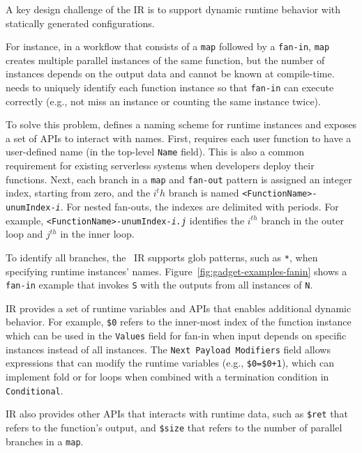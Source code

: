 A key design challenge of the \name{} IR is to support dynamic runtime
behavior with statically generated configurations.

For instance, in a workflow that consists of a \texttt{map} followed by a
\texttt{fan-in}, \texttt{map} creates multiple parallel instances of the same
function, but the number of instances depends on the output data and cannot be
known at compile-time. \name{} needs to uniquely identify each function
instance so that \texttt{fan-in} can execute correctly (e.g., not miss an
instance or counting the same instance twice).

To solve this problem, \name{} defines a naming scheme for runtime instances
and exposes a set of APIs to interact with names. First,
\name{} requires each user function to have a user-defined name (in the
top-level \texttt{Name} field). This is also a common requirement for existing
serverless systems when developers deploy their functions. Next, each branch
in a \texttt{map} and \texttt{fan-out} pattern is assigned an integer index,
starting from zero, and the $i^th$ branch is named
\texttt{<FunctionName>-unumIndex-\emph{i}}. For nested fan-outs, the indexes
are delimited with periods. For example,
\texttt{<FunctionName>-unumIndex-\emph{i.j}} identifies the $i^{th}$ branch in
the outer loop and $j^{th}$ in the inner loop.

To identify all branches, the \name{}~IR supports glob patterns, such as
\texttt{*}, when specifying runtime instances' names.
Figure~\ref{fig:gadget-examples-fanin} shows a \texttt{fan-in} example that
invokes \texttt{S} with the outputs from all instances of \texttt{N}.

\name{} IR provides a set of runtime variables and APIs that enables
additional dynamic behavior. For example, \texttt{\$0} refers to the
inner-most index of the function instance which can be used in the
\texttt{Values} field for fan-in when input depends on specific instances
instead of all instances. The \texttt{Next Payload Modifiers} field allows
expressions that can modify the runtime variables (e.g., \texttt{\$0=\$0+1}),
which can implement fold or for loops when combined with a termination
condition in \texttt{Conditional}.


\name{} IR also provides other APIs that interacts with runtime data, such as
\texttt{\$ret} that refers to the function's output, and \texttt{\$size} that
refers to the number of parallel branches in a \texttt{map}.
